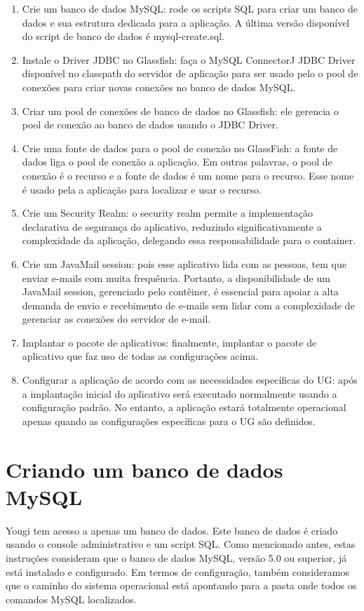 \documentclass[envcountsame,envcountchap]{svmono}
\begin{document}
\begin{enumerate}
\item Crie um banco de dados MySQL: rode os scripts SQL para criar um banco de dados e sua estrutura dedicada para a aplicação. A última versão disponível do script de banco de dados é mysql-create.sql.
\item Instale o Driver JDBC no Glassfish: faça o MySQL ConnectorJ JDBC Driver disponível no classpath do servidor de aplicação para ser usado pelo o pool de conexões para criar novas conexões no banco de dados MySQL.
\item Criar um pool de conexões de banco de dados no Glassfish: ele gerencia o pool de conexão ao banco de dados usando o JDBC Driver.
\item Crie uma fonte de dados para o pool de conexão no GlassFish: a fonte de dados liga o pool de conexão a aplicação. Em outras palavras, o pool de conexão é o recurso e a fonte de dados é um nome para o recurso. Esse nome é usado pela a aplicação para localizar e usar o recurso.
\item Crie um Security Realm: o security realm permite a implementação declarativa de segurança do aplicativo, reduzindo significativamente a complexidade da aplicação, delegando essa responsabilidade para o container.
\item Crie um JavaMail session: pois esse aplicativo lida com as pessoas, tem que enviar e-mails com muita frequência. Portanto, a disponibilidade de um JavaMail session, gerenciado pelo contêiner, é essencial para apoiar a alta demanda de envio e recebimento de e-mails sem lidar com a complexidade de gerenciar as conexões do servidor de e-mail.
\item Implantar o pacote de aplicativos: finalmente, implantar o pacote de aplicativo que faz uso de todas as configurações acima.
\item Configurar a aplicação de acordo com as necessidades específicas do UG: após a implantação inicial do aplicativo será executado normalmente usando a configuração padrão. No entanto, a aplicação estará totalmente operacional apenas quando as configurações específicas para o UG são definidos.
\end{enumerate}

\section{Criando um banco de dados MySQL}

Yougi tem acesso a apenas um banco de dados. Este banco de dados é criado usando o console administrativo e um script SQL. Como mencionado antes, estas instruções consideram que o banco de dados MySQL, versão 5.0 ou superior, já está instalado e configurado. Em termos de configuração, também consideramos que o caminho do sistema operacional está apontando para a pasta onde todos os comandos MySQL localizados.
\end{document}
